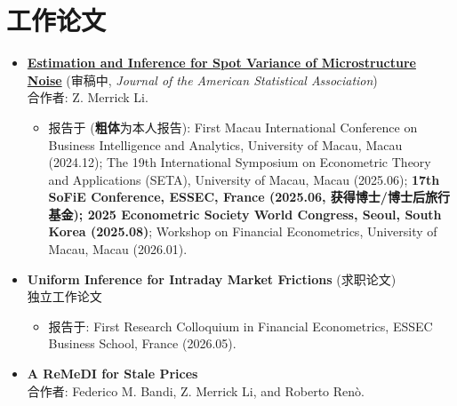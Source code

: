 \documentclass[11pt,a4paper]{article}
\begin{document}
\section{工作论文}
\begin{itemize}[leftmargin=1.4em, itemsep=0.9em, topsep=0.2em]
    \item \textbf{\href{https://www.researchgate.net/publication/417864546_Estimation_and_Inference_for_Spot_Variance_of_Microstructure_Noise?_tp=eyJjb250ZXh0Ijp7InBhZ2UiOiJwcm9maWxlIiwicHJldmlvdXNQYWdlIjoicHVibGljYXRpb24iLCJwb3NpdGlvbiI6InBhZ2VDb250ZW50Iiwic3ViUGFnZSI6Im92ZXJ2aWV3In19}
    {Estimation and Inference for Spot Variance of Microstructure Noise}} (审稿中, \textit{Journal of the American Statistical Association})\\[0.3em]
   合作者: Z. Merrick Li.
    \begin{itemize}[label=$\circ$, leftmargin=2.2em, itemsep=0.6em, topsep=0.3em]
        \item 报告于 (\textbf{粗体}为本人报告): 
        First Macau International Conference on Business Intelligence and Analytics, 
        University of Macau, Macau (2024.12); 
        The 19th International Symposium on Econometric Theory and Applications (SETA),
         University of Macau, Macau (2025.06); 
         \textbf{17th SoFiE Conference, ESSEC, France 
         (2025.06, 获得博士/博士后旅行基金); 
         2025 Econometric Society World Congress, Seoul, South Korea (2025.08)}; 
         Workshop on Financial Econometrics, University of Macau, Macau (2026.01).
    \end{itemize}
    \item \textbf{Uniform Inference for Intraday Market Frictions} (求职论文)\\[0.3em]
    独立工作论文
    \begin{itemize}[label=$\circ$, leftmargin=2.2em, itemsep=0.6em, topsep=0.3em]
        \item 报告于: 
        First Research Colloquium in Financial Econometrics, 
        ESSEC Business School, France (2026.05).
    \end{itemize}
    \item \textbf{A ReMeDI for Stale Prices}\\[0.3em]
        合作者: Federico M. Bandi, Z. Merrick Li, and Roberto Ren\`o.
\end{itemize}


\end{document}
